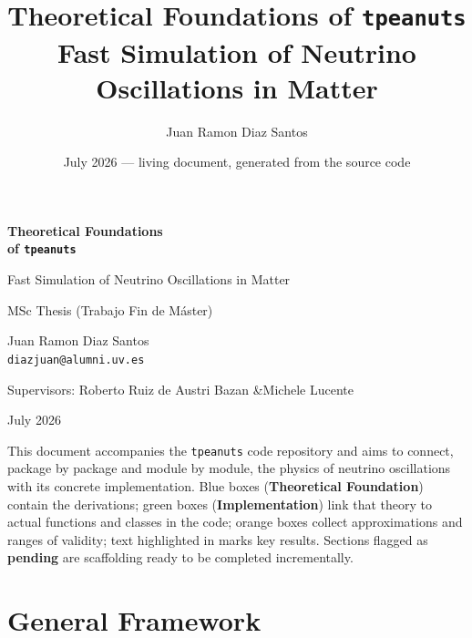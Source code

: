 \documentclass[11pt,a4paper,openany]{report}
\title{\Huge Theoretical Foundations of \texttt{tpeanuts}\\[4pt]
  \Large Fast Simulation of Neutrino Oscillations in Matter}
\author{Juan Ramon Diaz Santos}
\date{July 2026 --- living document, generated from the source code}
\begin{document}
\begin{titlepage}
  \centering
  \vspace*{2cm}
  {\Huge\bfseries\color{coreColor} Theoretical Foundations\\[4pt] of \texttt{tpeanuts}\par}
  \vspace{0.8cm}
  {\Large Fast Simulation of Neutrino Oscillations in Matter\par}
  \vspace{1.5cm}
  {\large MSc Thesis (Trabajo Fin de M\'aster)\par}
  \vspace{0.3cm}
  {\large Juan Ramon Diaz Santos \\ \texttt{diazjuan@alumni.uv.es}\par}
  \vspace{0.6cm}
  {\normalsize Supervisors: Roberto Ruiz de Austri Bazan \quad\&\quad Michele Lucente\par}
  \vfill
  {\normalsize July 2026\par}
  \vspace{0.5cm}
  \begin{tcolorbox}[colback=coreColor!5,colframe=coreColor,width=0.85\textwidth,sharp corners=all,rounded corners=all,arc=1mm]
    \small
    This document accompanies the \texttt{tpeanuts} code repository and aims
    to connect, package by package and module by module, the physics of
    neutrino oscillations with its concrete implementation. Blue boxes
    (\textbf{Theoretical Foundation}) contain the derivations; green boxes
    (\textbf{Implementation}) link that theory to actual functions and
    classes in the code; orange boxes collect approximations and ranges of
    validity; text highlighted in  marks key results.
    Sections flagged as \textcolor{pendingColor}{\textbf{pending}} are
    scaffolding ready to be completed incrementally. 
  \end{tcolorbox}
\end{titlepage}

\tableofcontents
{}
\clearpage
{}

\part{General Framework}

\end{document}
